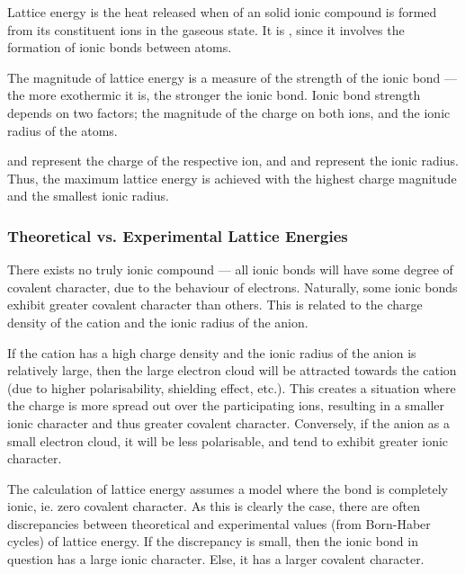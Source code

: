			Lattice energy is the heat released when  of an solid ionic compound is formed from its constituent ions in the
			gaseous state. It is , since it involves the formation of ionic bonds between atoms.

			The magnitude of lattice energy is a measure of the strength of the ionic bond — the more exothermic it is, the stronger the ionic bond.
			Ionic bond strength depends on two factors; the magnitude of the charge on both ions, and the ionic radius of the atoms.


			 and  represent the charge of the respective ion, and  and  represent
			the ionic radius. Thus, the maximum lattice energy is achieved with the highest charge magnitude and the smallest ionic radius.


			\subsubsection{Theoretical vs. Experimental Lattice Energies}

				There exists no truly ionic compound --- all ionic bonds will have some degree of covalent character, due to the behaviour of
				electrons. Naturally, some ionic bonds exhibit greater covalent character than others. This is related to the charge density
				of the cation and the ionic radius of the anion.

				If the cation has a high charge density and the ionic radius of the anion is relatively large, then the large electron cloud
				will be attracted towards the cation (due to higher polarisability, shielding effect, etc.). This creates a situation where the
				charge is more spread out over the participating ions, resulting in a smaller ionic character and thus greater covalent
				character. Conversely, if the anion as a small electron cloud, it will be less polarisable, and tend to exhibit greater ionic
				character.

				The calculation of lattice energy assumes a model where the bond is completely ionic, ie. zero covalent character. As this is
				clearly  the case, there are often discrepancies between theoretical and experimental values (from Born-Haber cycles)
				of lattice energy. If the discrepancy is small, then the ionic bond in question has a large ionic character. Else, it has a
				larger covalent character.

